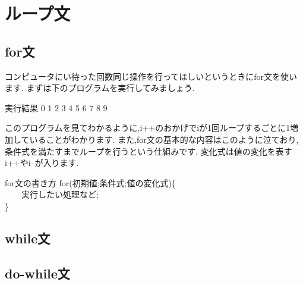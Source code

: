 ﻿\section{ループ文}
\subsection{for文}
 コンピュータにい待った回数同じ操作を行ってほしいというときにfor文を使います.
まずは下のプログラムを実行してみましょう.




\begin{itembox}{実行結果}
0 1 2 3 4 5 6 7 8 9

\end{itembox}
このプログラムを見てわかるように,i++のおかげでiが1回ループするごとに1増加していることがわかります.
また,for文の基本的な内容はこのように泣ており,条件式を満たすまでループを行うという仕組みです.
変化式は値の変化を表すi++やi--が入ります.

\begin{itembox}{for文の書き方}
for(初期値;条件式;値の変化式)\{ \\
~~~~実行したい処理など;\\
\}
\end{itembox}
\subsection{while文}

\subsection{do-while文}
